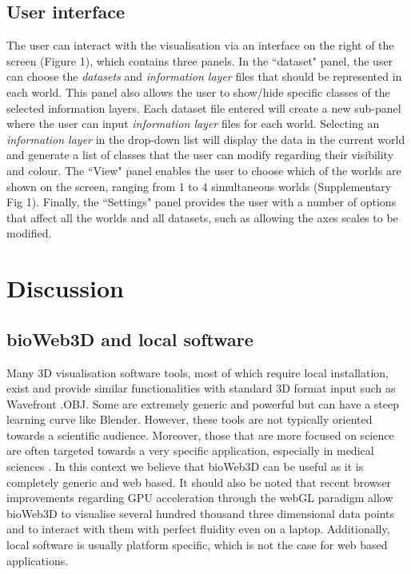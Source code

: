\documentclass{bioinfo}
\begin{document}
\subsection{User interface}
The user can interact with the visualisation via an interface on the right of the screen (Figure 1), which contains three panels. In the ``dataset" panel, the user can choose the {\it{datasets}} and {\it{information layer}} files that should be represented in each world. This panel also allows the user to show/hide specific classes of the selected information layers. Each dataset file entered will create a new sub-panel where the user can input {\it{information layer}} files for each world. Selecting an {\it{information layer}} in the drop-down list will display the data in the current world and generate a list of classes that the user can modify regarding their visibility and colour. The ``View" panel enables the user to choose which of the worlds are shown on the screen, ranging from 1 to 4 simultaneous worlds (Supplementary Fig 1). Finally, the ``Settings" panel provides the user with a number of options that affect all the worlds and all datasets, such as allowing the axes scales to be modified.


\section{Discussion}
	\subsection{bioWeb3D and local software}
Many 3D visualisation software tools, most of which require local installation, exist and provide similar functionalities with standard 3D format input such as Wavefront .OBJ. Some are extremely generic and powerful but can have a steep learning curve like Blender. However, these tools are not typically oriented towards a scientific audience. Moreover, those that are more focused on science are often targeted towards a very specific application, especially in medical sciences \citep{Wang09}. In this context we believe that bioWeb3D can be useful as it is completely generic and web based. It should also be noted that recent browser improvements regarding GPU acceleration through the webGL paradigm allow bioWeb3D to visualise several hundred thousand three dimensional data points and to interact with them with perfect fluidity even on a laptop. Additionally, local software is usually platform specific, which is not the case for web based applications.
\end{document}

